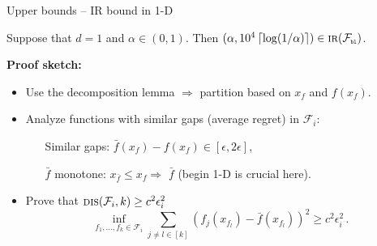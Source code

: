 \documentclass{beamer}
\newcommand{\dis}{\operatorname{\textsc{dis}}}
\newcommand{\cF}{\mathcal{F}}
\newcommand{\pb}{\text{\tiny\texttt{b}}}
\newcommand{\pl}{\text{\tiny\texttt{l}}}
\newcommand{\IR}{\operatorname{\textsc{ir}}}
\newcommand{\ceil}[1]{\left\lceil #1 \right\rceil}
\begin{document}

\begin{frame}{Upper bounds -- IR bound in 1-D}
    \small
    \begin{tcolorbox}[title=Theorem 3 -- IR bound for 1-D,colback=blue!5!white,colframe=blue!50!black]
        Suppose that $d = 1$ and $\alpha \in (0,1)$. Then $(\alpha, 10^4 \ceil{\log(1/\alpha)}) \in \IR(\cF_{\pb\pl})$.
    \end{tcolorbox}
    \textbf{Proof sketch:}
    \begin{itemize}
        \item Use the decomposition lemma $\Rightarrow$ partition  based on $x_f$ and $f(x_f)$.
        \item Analyze functions with similar gaps (average regret) in $\cF_i$:
              \begin{enumerate}
                  \leftskip=4em %
                  \item[Similar gaps:] $\bar{f}(x_f) - f(x_f) \in [\epsilon, 2\epsilon]$,
                  \item[$\bar{f}$ monotone:] $x_{\bar{f}} \leq x_f \Rightarrow $ $\bar{f}$ (begin 1-D is crucial here).
              \end{enumerate}
        \item Prove that $\dis(\cF_i, k) \geq c^2\epsilon_i^2$
              \[
                  \inf_{f_1,\ldots,f_k \in \cF_i} \sum_{j\neq l \in [k]} (f_j(x_{f_l}) - \bar f(x_{f_l}))^2 \geq c^2\epsilon_i^2\,.
              \]
    \end{itemize}
\end{frame}
\end{document}
